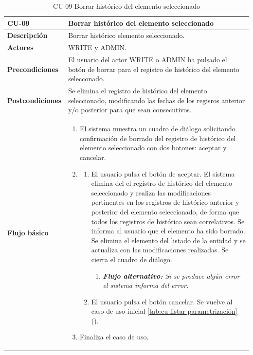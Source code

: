 \begin{table} [H]
    \centering
    \setlength{\leftmargini}{0.4cm}
	\resizebox{14cm}{!} { %
    \begin{tabular}{| m{3cm} | m{11cm} |}   
    \hline
	  \textbf{CU-09} & \textbf{Borrar histórico del elemento seleccionado} \\\hline
	  \textbf{Descripción} & Borrar histórico elemento seleccionado. \\\hline
	  \textbf{Actores} & WRITE y ADMIN. \\\hline
	  \textbf{Precondiciones} & El usuario del actor WRITE o ADMIN ha pulsado el botón de borrar para el registro de histórico del elemento selecconado. \\\hline
	  \textbf{Postcondiciones} & Se elimina el registro de histórico del elemento seleccionado, modificando las fechas de los regisros anterior y/o posterior para que sean consecutivos. \\\hline
	  \textbf{Flujo básico} & 
		\begin{enumerate}
	  	\item El sistema muestra un cuadro de diálogo solicitando confirmación de borrado del registro de histórico del elemento seleccionado con dos botones: aceptar y cancelar.
		\item 
			\begin{enumerate}	
			   \item El usuario pulsa el botón de aceptar. El sistema elimina del el registro de histórico del elemento seleccionado y realiza las modificaciones pertinentes en los registros de histórico anterior y posterior del elemento seleccionado, de forma que todos los registros de histórico sean correlativos. Se informa al usuario que el elemento ha sido borrado. Se elimina el elemento del listado de la entidad  y se actualiza con las modificaciones realizadas. Se cierra el cuadro de diálogo.
			   \begin{enumerate}	
			   \item  \textit{\textbf{Flujo alternativo:} Si se produce algún error el sistema informa del error.}
			   \end{enumerate}
			   \item El usuario pulsa el botón cancelar. Se vuelve al caso de uso inicial \ref{tab:cu-listar-parametrización} (\pageref{tab:cu-listar-parametrización}).
			\end{enumerate}
	  \item Finaliza el caso de uso.
	  \end{enumerate} 	  	  
	  \\\hline
    \end{tabular}
    } %
    \caption{CU-09 Borrar histórico del elemento seleccionado}
    \label{tab:cu-borrar-historico-elemento}
\end{table}


